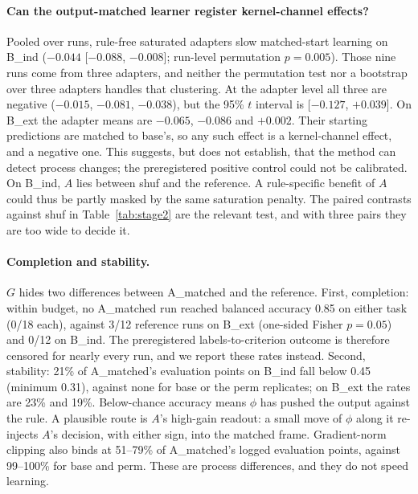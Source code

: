 \documentclass[11pt]{article}
\begin{document}
\paragraph{Can the output-matched learner register kernel-channel effects?} Pooled over runs, rule-free saturated adapters slow matched-start learning on B\_ind ($-0.044$ [$-0.088$, $-0.008$]; run-level permutation $p=0.005$). Those nine runs come from three adapters, and neither the permutation test nor a bootstrap over three adapters handles that clustering. At the adapter level all three are negative ($-0.015$, $-0.081$, $-0.038$), but the 95\% $t$ interval is [$-0.127$, $+0.039$]. On B\_ext the adapter means are $-0.065$, $-0.086$ and $+0.002$. Their starting predictions are matched to base's, so any such effect is a kernel-channel effect, and a negative one. This suggests, but does not establish, that the method can detect process changes; the preregistered positive control could not be calibrated. On B\_ind, $A$ lies between shuf and the reference. A rule-specific benefit of $A$ could thus be partly masked by the same saturation penalty. The paired contrasts against shuf in Table~\ref{tab:stage2} are the relevant test, and with three pairs they are too wide to decide it.

\paragraph{Completion and stability.} $G$ hides two differences between A\_matched and the reference. First, completion: within budget, no A\_matched run reached balanced accuracy 0.85 on either task (0/18 each), against 3/12 reference runs on B\_ext (one-sided Fisher $p=0.05$) and 0/12 on B\_ind. The preregistered labels-to-criterion outcome is therefore censored for nearly every run, and we report these rates instead. Second, stability: 21\% of A\_matched's evaluation points on B\_ind fall below 0.45 (minimum 0.31), against none for base or the perm replicates; on B\_ext the rates are 23\% and 19\%. Below-chance accuracy means $\phi$ has pushed the output against the rule. A plausible route is $A$'s high-gain readout: a small move of $\phi$ along it re-injects $A$'s decision, with either sign, into the matched frame. Gradient-norm clipping also binds at 51--79\% of A\_matched's logged evaluation points, against 99--100\% for base and perm. These are process differences, and they do not speed learning.
\end{document}
